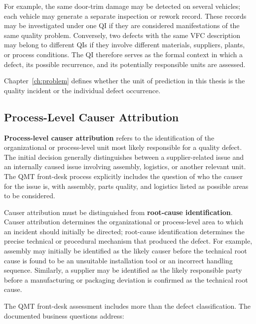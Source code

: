 For example, the same door-trim damage may be detected on several
vehicles; each vehicle may generate a separate inspection or rework
record. These records may be investigated under one QI if they are
considered manifestations of the same quality problem. Conversely, two
defects with the same VFC description may belong to different QIs if they
involve different materials, suppliers, plants, or process conditions. The
QI therefore serves as the formal context in which a defect, its possible
recurrence, and its potentially responsible units are assessed.

Chapter~\ref{ch:problem} defines whether the unit of prediction in this
thesis is the quality incident or the individual defect occurrence.

\subsection{Process-Level Causer Attribution}\label{sec:fund_bmw_causer}\label{sec:causer-attribution}

\textbf{Process-level causer attribution} refers to the identification of
the organizational or process-level unit most likely responsible for a
quality defect. The initial decision generally distinguishes between a
supplier-related issue and an internally caused issue involving assembly,
logistics, or another relevant unit. The QMT front-desk process explicitly
includes the question of who the causer for the issue is, with assembly,
parts quality, and logistics listed as possible areas to be considered.

Causer attribution must be distinguished from \textbf{root-cause
identification}. Causer attribution determines the organizational or
process-level area to which an incident should initially be directed;
root-cause identification determines the precise technical or procedural
mechanism that produced the defect. For example, assembly may initially be
identified as the likely causer before the technical root cause is found
to be an unsuitable installation tool or an incorrect handling sequence.
Similarly, a supplier may be identified as the likely responsible party
before a manufacturing or packaging deviation is confirmed as the
technical root cause.

The QMT front-desk assessment includes more than the defect
classification. The documented business questions address:

